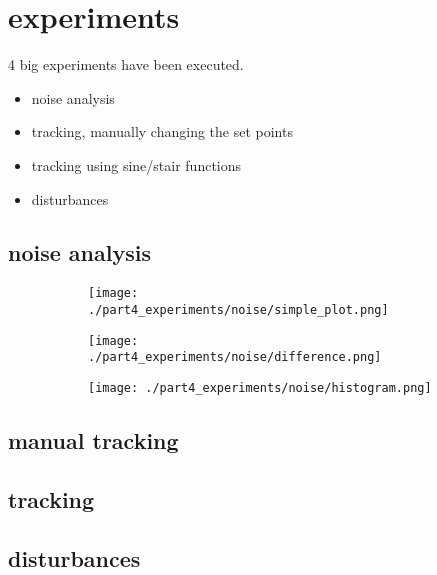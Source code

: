 \section{experiments}

4 big experiments have been executed.

\begin{itemize}
	\item noise analysis
	\item tracking, manually changing the set points
	\item tracking using sine/stair functions
	\item disturbances
\end{itemize}


\subsection{noise analysis}

\begin{figure}[H]
	\centering
	\begin{subfigure}[b]{0.45\textwidth}
		\texttt{[image: ./part4\_experiments/noise/simple\_plot.png]}
	\end{subfigure}
	\begin{subfigure}[b]{0.45\textwidth}
		\texttt{[image: ./part4\_experiments/noise/difference.png]}
	\end{subfigure}
	\begin{subfigure}[b]{0.45\textwidth}
		\texttt{[image: ./part4\_experiments/noise/histogram.png]}
	\end{subfigure}
\end{figure}

\subsection{manual tracking}

\subsection{tracking}

\subsection{disturbances}